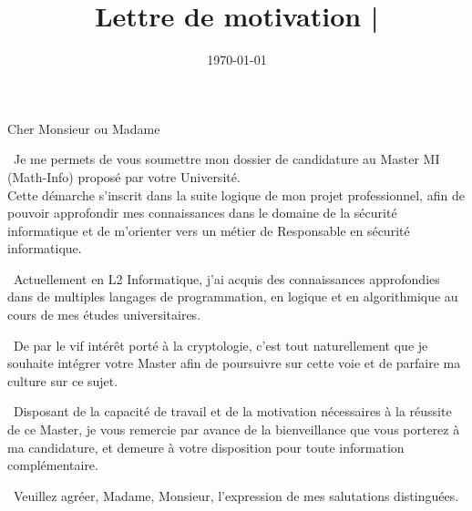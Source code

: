 \documentclass[11pt,a4paper,sans]{moderncv}
\title{Lettre de motivation |}
\begin{document}
\date{\today}
\opening{Cher Monsieur ou Madame}
\makelettertitle
\ Je me permets de vous soumettre mon dossier de candidature au Master MI (Math-Info) proposé par votre Université. \\
Cette démarche s’inscrit dans la suite logique de mon projet professionnel, afin de pouvoir approfondir mes connaissances dans le domaine de la sécurité informatique et de m'orienter vers un métier de Responsable en sécurité informatique.

\ Actuellement en L2 Informatique, j’ai acquis des connaissances approfondies dans de multiples langages de programmation, en logique et en algorithmique au cours de mes études universitaires.

\ De par le vif intérêt porté à la cryptologie, c’est tout naturellement que je souhaite intégrer votre Master afin de poursuivre sur cette voie et de parfaire ma culture sur ce sujet.

\ Disposant de la capacité de travail et de la motivation nécessaires à la réussite de ce Master, je vous remercie par avance de la bienveillance que vous porterez à ma candidature, et demeure à votre disposition pour toute information complémentaire.

\ Veuillez agréer, Madame, Monsieur, l’expression de mes salutations distinguées.
\makeletterclosing
\end{document}
